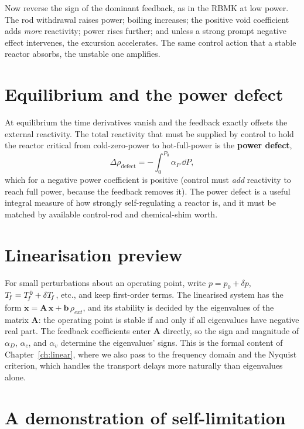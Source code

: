 Now reverse the sign of the dominant feedback, as in the RBMK at low power. The
rod withdrawal raises power; boiling increases; the positive void coefficient
adds \emph{more} reactivity; power rises further; and unless a strong prompt
negative effect intervenes, the excursion accelerates. The same control action
that a stable reactor absorbs, the unstable one amplifies.

\section{Equilibrium and the power defect}

At equilibrium the time derivatives vanish and the feedback exactly offsets the
external reactivity. The total reactivity that must be supplied by control to
hold the reactor critical from cold-zero-power to hot-full-power is the
\textbf{power defect},
\begin{equation}
\Delta\rho_{\text{defect}} = -\!\int_0^{P_0}\!\alpha_P\,\dd P,
\end{equation}
which for a negative power coefficient is positive (control must \emph{add}
reactivity to reach full power, because the feedback removes it). The power defect
is a useful integral measure of how strongly self-regulating a reactor is, and it
must be matched by available control-rod and chemical-shim worth.

\section{Linearisation preview}

For small perturbations about an operating point, write $p=p_0+\delta p$,
$T_{\!f}=T_{\!f}^0+\delta T_{\!f}$, etc., and keep first-order terms. The linearised system
has the form $\dot{\mathbf x}=\mathbf A\,\mathbf x + \mathbf b\,\rho_{ext}$, and
its stability is decided by the eigenvalues of the matrix $\mathbf A$: the
operating point is stable if and only if all eigenvalues have negative real part.
The feedback coefficients enter $\mathbf A$ directly, so the sign and magnitude of
$\alpha_D$, $\alpha_c$, and $\alpha_v$ determine the eigenvalues' signs. This is
the formal content of Chapter~\ref{ch:linear}, where we also pass to the frequency
domain and the Nyquist criterion, which handles the transport delays more
naturally than eigenvalues alone.

\section{A demonstration of self-limitation}

